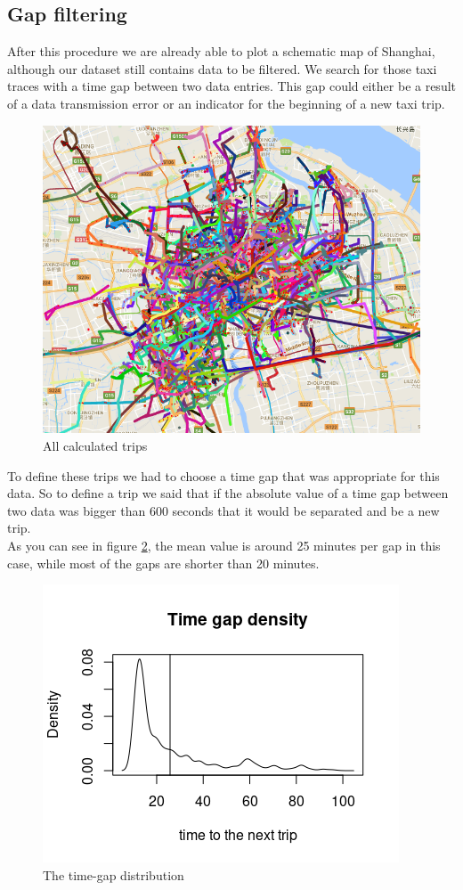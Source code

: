 \documentclass[11pt,conference,a4paper,twocolumns,romanappendices]{IEEEtran}
\begin{document}
\subsection{Gap filtering}
After this procedure we are already able to plot a schematic map of Shanghai, although our dataset still contains data to be filtered. We search for those taxi traces with a time gap between two data entries. This gap could either be a result of a data transmission error or an indicator for the beginning of a new taxi trip.\\
\begin{figure}[h]
\centering
\includegraphics[scale=0.35]{plotalltrips.png}
\caption{\label{fig:plotalltrips}All calculated trips}
\end{figure}
To define these trips we had to choose a time gap that was appropriate for this data. So to define a trip we said that if the absolute value of a time gap between two data was bigger than 600 seconds that it would be separated and be a new trip.\\
As you can see in figure \ref{fig:timegap}, the mean value is around 25 minutes per gap in this case, while most of the gaps are shorter than 20 minutes. \\
\begin{figure}[h]
\centering
\includegraphics[scale=0.75]{timegap.png}
\caption{\label{fig:timegap}The time-gap distribution}
\end{figure}
\end{document}
